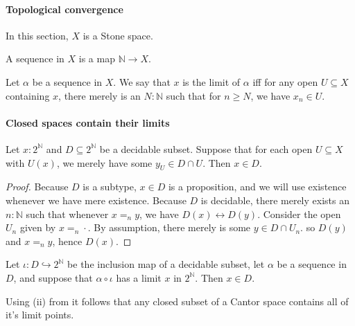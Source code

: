 \paragraph{Topological convergence}
In this section, $X$ is a Stone space. 
\begin{definition}
  A sequence in $X$ is a map $\mathbb N \to X$. 
\end{definition} 
\begin{definition}
  Let $\alpha$ be a sequence in $X$. 
  We say that $x$ is the limit of $\alpha$ iff 
  for any open $U\subseteq X$ containing $x$, 
  there merely is an $N:\mathbb N$ such that for $n \geq N$, we have
  $x_n \in U$. 
\end{definition}

\paragraph{Closed spaces contain their limits}
\begin{lemma}
  Let $x:2^\mathbb N$ and $D\subseteq 2^\mathbb N$ be a decidable subset. 
  Suppose that for each open $U\subseteq X$ with $U(x)$,
  we merely have some $y_U \in D \cap U$. 
  Then $x\in D$. 
\end{lemma}
\begin{proof}
  Because $D$ is a subtype, $x\in D$ is a proposition, and we will use existence whenever we have mere existence.
  Because $D$ is decidable, %
  there merely exists an $n:\mathbb N$ such that 
  whenever $x =_n y$, we have $D(x) \leftrightarrow D(y)$. 
  Consider the open $U_n$ given by $x =_n \cdot $.
  By assumption, there merely is some $y\in D\cap U_n$. 
  so $D(y)$ and $x =_n y$, hence $D(x)$.
\end{proof}
\begin{corollary}
  Let $\iota :D\hookrightarrow 2^\mathbb N$ be the inclusion map of a decidable subset, 
  let $\alpha$ be a sequence in $D$, and 
  suppose that $\alpha\circ \iota$ has a limit $x$ in $2^\mathbb N$. 
  Then $x\in D$. 
\end{corollary}
\begin{corollary}
  Using (ii) from  it follows that any 
  closed subset of a Cantor space contains all of it's limit points. 
\end{corollary}
